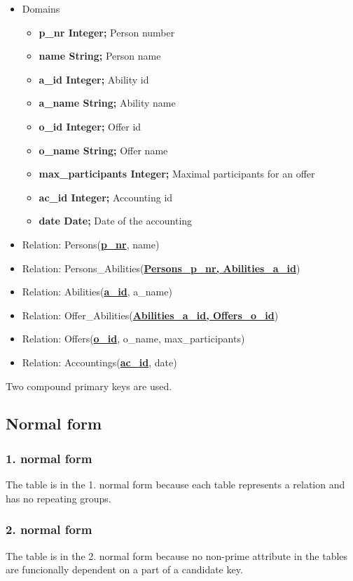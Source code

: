 \documentclass[12pt,a4paper,english]{article}
\begin{document}
\begin{itemize}
	\item Domains
		\begin{itemize}
			\item \textbf{p\_nr Integer;} Person number
			\item \textbf{name String;} Person name
			\item \textbf{a\_id Integer;} Ability id
			\item \textbf{a\_name String;} Ability name
			\item \textbf{o\_id Integer;} Offer id
			\item \textbf{o\_name String;} Offer name
			\item \textbf{max\_participants Integer;} Maximal participants for an offer
			\item \textbf{ac\_id Integer;} Accounting id
			\item \textbf{date Date;} Date of the accounting
		\end{itemize}
	\item Relation: Persons(\textbf{\underline{p\_nr}}, name)
	\item Relation: Persons\_Abilities(\textbf{\underline{Persons\_p\_nr, Abilities\_a\_id}})
	\item Relation: Abilities(\textbf{\underline{a\_id}}, a\_name)
	\item Relation: Offer\_Abilities(\textbf{\underline{Abilities\_a\_id, Offers\_o\_id}})
	\item Relation: Offers(\textbf{\underline{o\_id}}, o\_name, max\_participants)
	\item Relation: Accountings(\textbf{\underline{ac\_id}}, date)
\end{itemize}
Two compound primary keys are used.

\subsection{Normal form}
\subsubsection{1. normal form}
The table is in the 1. normal form because each table represents a relation and has no repeating groups. 

\subsubsection{2. normal form}
The table is in the 2. normal form because no non-prime attribute in the tables are funcionally dependent on a part of a candidate key. 
\end{document}
